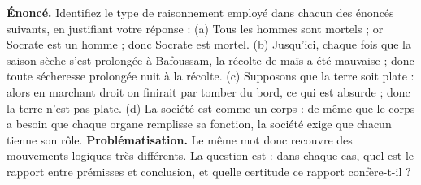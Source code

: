 \documentclass[11pt]{article}
\begin{document}
\begin{exoresolu}
\textbf{Énoncé.} Identifiez le type de raisonnement employé dans chacun des énoncés suivants, en justifiant votre réponse : (a) \guillemotleft Tous les hommes sont mortels ; or Socrate est un homme ; donc Socrate est mortel. \guillemotright (b) \guillemotleft Jusqu'ici, chaque fois que la saison sèche s'est prolongée à Bafoussam, la récolte de maïs a été mauvaise ; donc toute sécheresse prolongée nuit à la récolte. \guillemotright (c) \guillemotleft Supposons que la terre soit plate : alors en marchant droit on finirait par tomber du bord, ce qui est absurde ; donc la terre n'est pas plate. \guillemotright (d) \guillemotleft La société est comme un corps : de même que le corps a besoin que chaque organe remplisse sa fonction, la société exige que chacun tienne son rôle. \guillemotright
\tcblower
\textbf{Problématisation.} Le même mot \guillemotleft donc \guillemotright recouvre des mouvements logiques très différents. La question est : dans chaque cas, quel est le rapport entre prémisses et conclusion, et quelle certitude ce rapport confère-t-il ?


\end{exoresolu}
\end{document}
